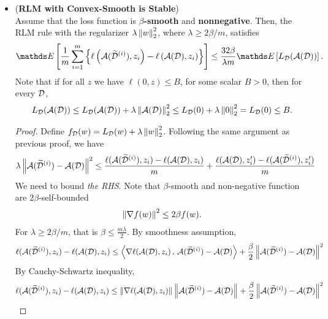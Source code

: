 \documentclass[11pt]{article}
\begin{document}
\begin{itemize}
\item \begin{corollary}(\textbf{RLM with Convex-Smooth is Stable}) \citep{shalev2014understanding}\\
Assume that the loss function is \textbf{$\beta$-smooth} and \textbf{nonnegative}. Then, the RLM rule with the regularizer $\lambda\left\|w\right\|_{2}^2$, where $\lambda \ge 2\beta/m$, satisfies
\begin{align}
\E{}{\frac{1}{m}\sum_{i=1}^{m}\set{\ell\paren{\cA(\widetilde{\cD}^{(i)}), z_i} - \ell\paren{\cA(\cD), z_i}}} \le \frac{32 \beta}{\lambda m}\E{}{L_{\cD}(\cA(\cD))}. \label{def: convex_smooth_stable}
\end{align}
Note that if for all $z$ we have $\ell(0, z) \le B$, for some scalar $B > 0$, then for every ${\mathcal D}$,
\begin{align*} 
L_{{\mathcal D}}({\mathcal A}({\mathcal D})) \le L_{{\mathcal D}}({\mathcal A}({\mathcal D}))+ \lambda\left\|{\mathcal A}({\mathcal D})\right\|_{2}^2 \le L_{{\mathcal D}}(0) +\lambda\left\|0\right\|_{2}^2 = L_{{\mathcal D}}(0) \le B. 
\end{align*} 
\end{corollary}
\begin{proof} 
Define $f_{{\mathcal D}}(w) = L_{{\mathcal D}}(w) + \lambda \left\|w\right\|_{2}^2$. Following the same argument as previous proof, we have
\begin{align}
 \lambda \left\|{\mathcal A}(\widetilde{{\mathcal D}}^{(i)}) - {\mathcal A}({\mathcal D})\right\|_{}^2 &\le  \frac{\ell({\mathcal A}(\widetilde{{\mathcal D}}^{(i)}), z_i) - \ell({\mathcal A}({\mathcal D}), z_i)}{m} + \frac{\ell({\mathcal A}({\mathcal D}), z_i') - \ell({\mathcal A}(\widetilde{{\mathcal D}}^{(i)}), z_i') }{m}  \label{pf: convex_smooth_stable_0}
\end{align} We need to bound \emph{the RHS}.
Note that $\beta$-smooth and non-negative function are $2\beta$-self-bounded
\begin{align*}
\left\|\nabla f(w)\right\|_{}^2 \le 2\beta f(w).
\end{align*} For $\lambda \ge 2\beta/m$, that is $\beta \le \frac{m \lambda}{2}$. By smoothness assumption, 
\begin{align}
\ell({\mathcal A}(\widetilde{{\mathcal D}}^{(i)}), z_i) - \ell({\mathcal A}({\mathcal D}), z_i) \le \left\langle \nabla  \ell({\mathcal A}({\mathcal D}), z_i)\,,\, {\mathcal A}(\widetilde{{\mathcal D}}^{(i)}) - {\mathcal A}({\mathcal D}) \right\rangle + \frac{\beta}{2} \left\|{\mathcal A}(\widetilde{{\mathcal D}}^{(i)}) - {\mathcal A}({\mathcal D})\right\|_{}^2 \label{pf: convex_smooth_stable_1}
\end{align} By Cauchy-Schwartz inequality,
\begin{align*}
\ell(\cA(\widetilde{\cD}^{(i)}), z_i) - \ell(\cA(\cD), z_i) \le \norm{\nabla  \ell(\cA(\cD), z_i)}{}\norm{\cA(\widetilde{\cD}^{(i)}) - \cA(\cD)}{} +  \frac{\beta}{2} \norm{\cA(\widetilde{\cD}^{(i)}) - \cA(\cD)}{}^2 

\end{align*}
\end{proof}
\end{itemize}
\end{document}
